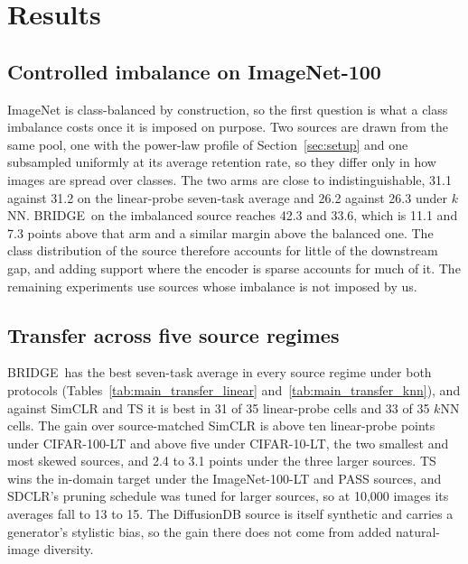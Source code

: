 \documentclass{article}
\newcommand{\method}{BRIDGE}
\begin{document}
\section{Results}
\label{sec:results}
\subsection{Controlled imbalance on ImageNet-100}
\label{sec:controlled}

ImageNet is class-balanced by construction, so the first question is what a class imbalance costs once it is imposed on purpose. Two sources are drawn from the same pool, one with the power-law profile of Section~\ref{sec:setup} and one subsampled uniformly at its average retention rate, so they differ only in how images are spread over classes. The two arms are close to indistinguishable, 31.1 against 31.2 on the linear-probe seven-task average and 26.2 against 26.3 under $k$NN. \method\ on the imbalanced source reaches 42.3 and 33.6, which is 11.1 and 7.3 points above that arm and a similar margin above the balanced one. The class distribution of the source therefore accounts for little of the downstream gap, and adding support where the encoder is sparse accounts for much of it. The remaining experiments use sources whose imbalance is not imposed by us.

\subsection{Transfer across five source regimes}


\method\ has the best seven-task average in every source regime under both protocols (Tables~\ref{tab:main_transfer_linear} and~\ref{tab:main_transfer_knn}), and against SimCLR and TS it is best in 31 of 35 linear-probe cells and 33 of 35 $k$NN cells. The gain over source-matched SimCLR is above ten linear-probe points under CIFAR-100-LT and above five under CIFAR-10-LT, the two smallest and most skewed sources, and 2.4 to 3.1 points under the three larger sources. TS wins the in-domain target under the ImageNet-100-LT and PASS sources, and SDCLR's pruning schedule was tuned for larger sources, so at 10{,}000 images its averages fall to 13 to 15. The DiffusionDB source is itself synthetic and carries a generator's stylistic bias, so the gain there does not come from added natural-image diversity.
\end{document}
